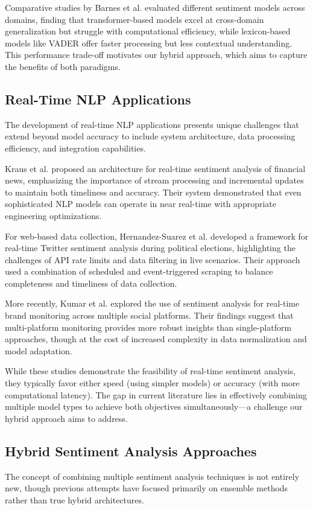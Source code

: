 \documentclass[conference]{IEEEtran}
\begin{document}
Comparative studies by Barnes et al. \cite{barnes2019sentiment} evaluated different sentiment models across domains, finding that transformer-based models excel at cross-domain generalization but struggle with computational efficiency, while lexicon-based models like VADER offer faster processing but less contextual understanding. This performance trade-off motivates our hybrid approach, which aims to capture the benefits of both paradigms.

\subsection{Real-Time NLP Applications}
The development of real-time NLP applications presents unique challenges that extend beyond model accuracy to include system architecture, data processing efficiency, and integration capabilities.

Kraus et al. \cite{kraus2020real} proposed an architecture for real-time sentiment analysis of financial news, emphasizing the importance of stream processing and incremental updates to maintain both timeliness and accuracy. Their system demonstrated that even sophisticated NLP models can operate in near real-time with appropriate engineering optimizations.

For web-based data collection, Hernandez-Suarez et al. \cite{hernandez2018real} developed a framework for real-time Twitter sentiment analysis during political elections, highlighting the challenges of API rate limits and data filtering in live scenarios. Their approach used a combination of scheduled and event-triggered scraping to balance completeness and timeliness of data collection.

More recently, Kumar et al. \cite{kumar2022real} explored the use of sentiment analysis for real-time brand monitoring across multiple social platforms. Their findings suggest that multi-platform monitoring provides more robust insights than single-platform approaches, though at the cost of increased complexity in data normalization and model adaptation.

While these studies demonstrate the feasibility of real-time sentiment analysis, they typically favor either speed (using simpler models) or accuracy (with more computational latency). The gap in current literature lies in effectively combining multiple model types to achieve both objectives simultaneously—a challenge our hybrid approach aims to address.

\subsection{Hybrid Sentiment Analysis Approaches}
The concept of combining multiple sentiment analysis techniques is not entirely new, though previous attempts have focused primarily on ensemble methods rather than true hybrid architectures.
\end{document}
